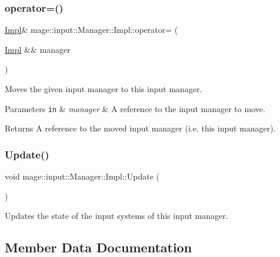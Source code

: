 \subsubsection{\texorpdfstring{operator=()}{operator=()}\hspace{0.1cm}{\footnotesize\ttfamily [2/2]}}
{\footnotesize\ttfamily \mbox{\hyperlink{classmage_1_1input_1_1_manager_1_1_impl}{Impl}}\& mage\+::input\+::\+Manager\+::\+Impl\+::operator= (\begin{DoxyParamCaption}\item[{\mbox{\hyperlink{classmage_1_1input_1_1_manager_1_1_impl}{Impl}} \&\&}]{manager }\end{DoxyParamCaption})\hspace{0.3cm}{\ttfamily [delete]}}

Moves the given input manager to this input manager.


\begin{DoxyParams}[1]{Parameters}
\mbox{\tt in}  & {\em manager} & A reference to the input manager to move. \\
\hline
\end{DoxyParams}
\begin{DoxyReturn}{Returns}
A reference to the moved input manager (i.\+e. this input manager). 
\end{DoxyReturn}
\mbox{\label{classmage_1_1input_1_1_manager_1_1_impl_ac9e9b6d976dfdb2379664cf362c68600}} 
\subsubsection{\texorpdfstring{Update()}{Update()}}
{\footnotesize\ttfamily void mage\+::input\+::\+Manager\+::\+Impl\+::\+Update (\begin{DoxyParamCaption}{ }\end{DoxyParamCaption})\hspace{0.3cm}{\ttfamily [noexcept]}}

Updates the state of the input systems of this input manager. 

\subsection{Member Data Documentation}
\mbox{\label{classmage_1_1input_1_1_manager_1_1_impl_afa76fc86c9bc75ac5c00414bc3d03fdb}} 
